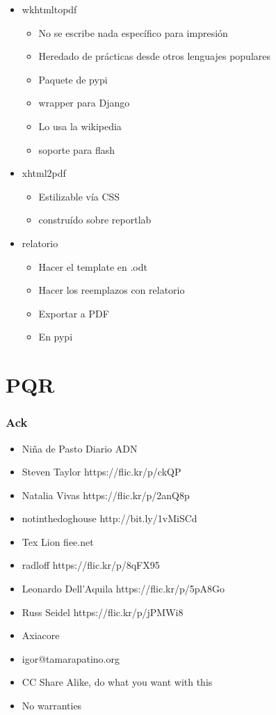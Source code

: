 \documentclass[8pt,xcolor={usenames,dvipsnames}]{beamer}
\begin{document}
\begin{frame}
  \begin{itemize}
  \item wkhtmltopdf
    \begin{itemize}
      \item No se escribe nada específico para impresión
      \item Heredado de prácticas desde otros lenguajes populares
      \item Paquete de pypi
      \item wrapper para Django
      \item Lo usa la wikipedia
      \item soporte para flash
    \end{itemize}
  \item xhtml2pdf
    \begin{itemize}
    \item Estilizable vía CSS
    \item construído sobre reportlab
    \end{itemize}
  \item relatorio
    \begin{itemize}
    \item Hacer el template en .odt
    \item Hacer los reemplazos con relatorio
    \item Exportar a PDF
    \item En pypi
    \end{itemize}
  \end{itemize}

\end{frame}


\section{PQR}

\begin{frame}
\frametitle{Ack}
  \begin{itemize}
  \item Niña de Pasto Diario ADN
  \item Steven Taylor https://flic.kr/p/ckQP
  \item Natalia Vivas https://flic.kr/p/2anQ8p
  \item notinthedoghouse http://bit.ly/1vMiSCd
  \item Tex Lion fiee.net
  \item radloff https://flic.kr/p/8qFX95
  \item Leonardo Dell'Aquila https://flic.kr/p/5pA8Go
  \item Russ Seidel https://flic.kr/p/jPMWi8
  \item Axiacore
  \item igor@tamarapatino.org
  \item CC Share Alike, do what you want with this
  \item No warranties
  \end{itemize}
\end{frame}
\end{document}
